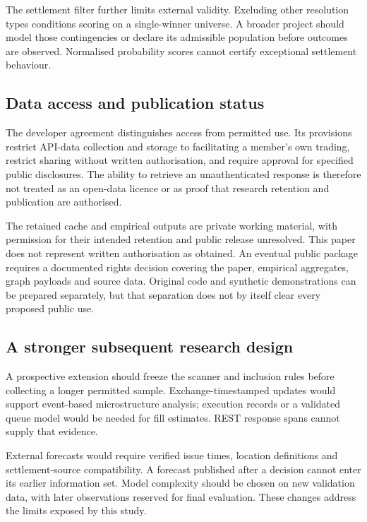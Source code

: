 The settlement filter further limits external validity. Excluding other resolution types conditions scoring on a single-winner universe. A broader project should model those contingencies or declare its admissible population before outcomes are observed. Normalised probability scores cannot certify exceptional settlement behaviour.

\subsection{Data access and publication status}\label{sec:rights}
The  developer agreement distinguishes access from permitted use. Its provisions restrict API-data collection and storage to facilitating a member's own trading, restrict sharing without written authorisation, and require approval for specified public disclosures. The ability to retrieve an unauthenticated response is therefore not treated as an open-data licence or as proof that research retention and publication are authorised.

The retained cache and empirical outputs are private working material, with permission for their intended retention and public release unresolved. This paper does not represent written authorisation as obtained. An eventual public package requires a documented rights decision covering the paper, empirical aggregates, graph payloads and source data. Original code and synthetic demonstrations can be prepared separately, but that separation does not by itself clear every proposed public use.

\subsection{A stronger subsequent research design}
A prospective extension should freeze the scanner and inclusion rules before collecting a longer permitted sample. Exchange-timestamped updates would support event-based microstructure analysis; execution records or a validated queue model would be needed for fill estimates. REST response spans cannot supply that evidence.

External forecasts would require verified issue times, location definitions and settlement-source compatibility. A forecast published after a decision cannot enter its earlier information set. Model complexity should be chosen on new validation data, with later observations reserved for final evaluation. These changes address the limits exposed by this study.

